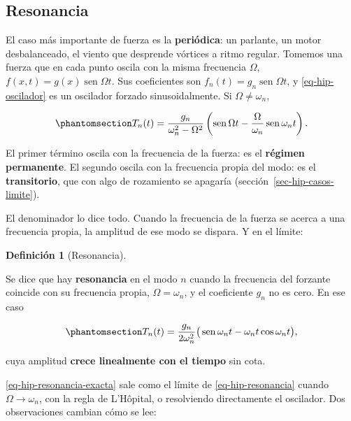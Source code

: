 \documentclass[
  spanish,
  a4paper,
]{scrbook}
\theoremstyle{definition}
\newtheorem{definition}{Definición}[chapter]
\theoremstyle{plain}
\theoremstyle{definition}
\theoremstyle{plain}
\theoremstyle{definition}
\theoremstyle{remark}
\begin{document}
\subsection{Resonancia}\label{sec-hip-resonancia}

El caso más importante de fuerza es la \textbf{periódica}: un parlante,
un motor desbalanceado, el viento que desprende vórtices a ritmo
regular. Tomemos una fuerza que en cada punto oscila con la misma
frecuencia \(\Omega\), \(f(x,t) = g(x)\operatorname{sen}\Omega t\). Sus
coeficientes son \(f_n(t) = g_n\operatorname{sen}\Omega t\), y
\ref{eq-hip-oscilador} es un oscilador forzado sinusoidalmente. Si
\(\Omega\neq\omega_n\),

\begin{equation}\protect\phantomsection\label{eq-hip-resonancia}{
T_n(t) = \frac{g_n}{\omega_n^2-\Omega^2}\left(\operatorname{sen}\Omega t - \frac{\Omega}{\omega_n}\operatorname{sen}\omega_nt\right).
}\end{equation}

El primer término oscila con la frecuencia de la fuerza: es el
\textbf{régimen permanente}. El segundo oscila con la frecuencia propia
del modo: es el \textbf{transitorio}, que con algo de rozamiento se
apagaría (sección~\ref{sec-hip-casos-limite}).

El denominador lo dice todo. Cuando la frecuencia de la fuerza se acerca
a una frecuencia propia, la amplitud de ese modo se dispara. Y en el
límite:

\begin{definition}[Resonancia]\protect\hypertarget{def-hip-resonancia}{}\label{def-hip-resonancia}

Se dice que hay \textbf{resonancia} en el modo \(n\) cuando la
frecuencia del forzante coincide con su frecuencia propia,
\(\Omega = \omega_n\), y el coeficiente \(g_n\) no es cero. En ese caso

\begin{equation}\protect\phantomsection\label{eq-hip-resonancia-exacta}{
T_n(t) = \frac{g_n}{2\omega_n^2}\big(\operatorname{sen}\omega_nt - \omega_nt\cos\omega_nt\big),
}\end{equation}

cuya amplitud \textbf{crece linealmente con el tiempo} sin cota.

\end{definition}

\ref{eq-hip-resonancia-exacta} sale como el límite de
\ref{eq-hip-resonancia} cuando \(\Omega\to\omega_n\), con la regla de
L'Hôpital, o resolviendo directamente el oscilador. Dos observaciones
cambian cómo se lee:
\end{document}
